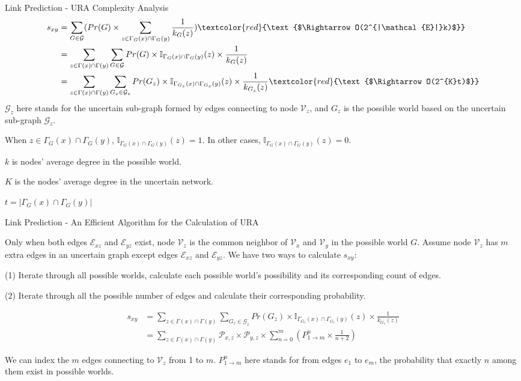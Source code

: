\documentclass[9pt]{beamer}
\begin{document}
\begin{frame}{Link Prediction - URA Complexity Analysis}
\begin{align*}
s_{xy}&=\sum_{G\in \mathcal{G}}( Pr(G)\times\sum_{z\in \Gamma_G(x)\cap\Gamma_G(y)}\frac{1}{k_G(z)}) \textcolor{red}{\text{$\Rightarrow O(2^{|\mathcal{E}|}k)$}}\\
&=\sum_{z\in \Gamma(x)\cap\Gamma(y)}\sum_{G\in \mathcal{G}}Pr(G)\times\mathbb{I}_{\Gamma_G(x)\cap\Gamma_G(y)}(z)\times \frac{1}{k_G(z)}\\
&=\sum_{z\in \Gamma(x)\cap\Gamma(y)}\sum_{{G_z}\in \mathcal{G}_z}Pr({G_z})\times\mathbb{I}_{\Gamma_{G_z}(x)\cap\Gamma_{G_z}(y)}(z)\times \frac{1}{k_{G_z}(z)}\textcolor{red}{\text{$\Rightarrow O(2^{K}t)$}}\\
\end{align*}
$\mathcal{G}_z$ here stands for the uncertain sub-graph formed by edges connecting to node $\mathcal{V}_z$, and $G_z$ is the possible world based on the uncertain sub-graph $\mathcal{G}_z$.

When $z\in \Gamma_G(x)\cap\Gamma_G(y)$, $\mathbb{I}_{\Gamma_G(x)\cap\Gamma_G(y)}(z)=1$. In other cases, $\mathbb{I}_{\Gamma_G(x)\cap\Gamma_G(y)}(z)=0$.

$k$ is nodes' average degree in the possible world.

$K$ is the nodes' average degree in the uncertain network.

$t=|\Gamma_G(x)\cap\Gamma_G(y)|$
\end{frame}

\begin{frame}{Link Prediction - An Efficient Algorithm for the Calculation of URA}

Only when both edges $\mathcal{E}_{xz}$ and $\mathcal{E}_{yz}$ exist, node $\mathcal{V}_z$ is the common neighbor of $\mathcal{V}_x$ and $\mathcal{V}_y$ in the possible world $G$. Assume node $\mathcal{V}_z$ has $m$ extra edges in an uncertain graph except edges $\mathcal{E}_{xz}$ and $\mathcal{E}_{yz}$. We have two ways to calculate $s_{xy}$:

(1) Iterate through all possible worlds, calculate each possible world's possibility and its corresponding count of edges.

(2) Iterate through all the possible number of edges and calculate their corresponding probability.

\begin{align*}
s_{xy}&=\sum_{z\in \Gamma(x)\cap\Gamma(y)}\sum_{{G_z}\in \mathcal{G}_z}Pr({G_z})\times\mathbb{I}_{\Gamma_{G_z}(x)\cap\Gamma_{G_z}(y)}(z)\times \frac{1}{k_{G_z}(z)}\\
&=\sum_{z\in \Gamma(x)\cap\Gamma(y)}\mathcal{P}_{x,z}\times\mathcal{P}_{y,z} \times \sum_{n=0}^{m}(P_{1\rightarrow m}^n \times \frac{1}{n+2})
\end{align*}

We can index the $m$ edges connecting to $\mathcal{V}_z$ from 1 to $m$. $P_{1\rightarrow m}^n$ here stands for from edges $e_1$ to $e_m$, the probability that exactly $n$ among them exist in possible worlds.

\end{frame}
\end{document}
